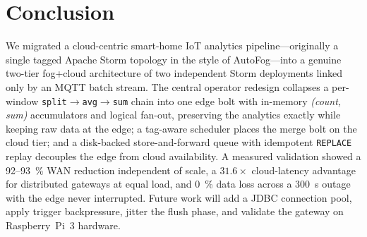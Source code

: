 \documentclass[conference]{IEEEtran}
\newcommand{\code}[1]{\texttt{#1}}
\begin{document}
\section{Conclusion}\label{sec:conclusion}
We migrated a cloud-centric smart-home IoT analytics pipeline---originally a
single tagged Apache Storm topology in the style of AutoFog---into a genuine
two-tier fog+cloud architecture of two independent Storm deployments linked only
by an MQTT batch stream. The central operator redesign collapses a per-window
\code{split}$\to$\code{avg}$\to$\code{sum} chain into one edge bolt with in-memory
\emph{(count, sum)} accumulators and logical fan-out, preserving the analytics
exactly while keeping raw data at the edge; a tag-aware scheduler places the merge
bolt on the cloud tier; and a disk-backed store-and-forward queue with idempotent
\code{REPLACE} replay decouples the edge from cloud availability. A measured
validation showed a \SI{92}{}--\SI{93}{\percent} WAN reduction independent of
scale, a $31.6\times$ cloud-latency advantage for distributed gateways at equal
load, and \SI{0}{\percent} data loss across a \SI{300}{\second} outage with the
edge never interrupted. Future work will add a JDBC connection pool, apply trigger
backpressure, jitter the flush phase, and validate the gateway on Raspberry~Pi~3
hardware.
\end{document}

